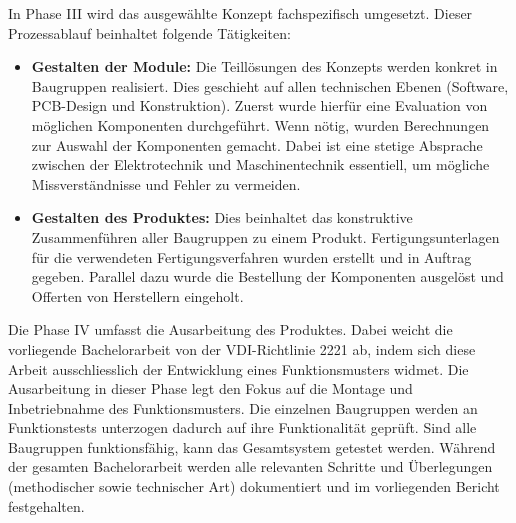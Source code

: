 In Phase III wird das ausgewählte Konzept fachspezifisch umgesetzt.  Dieser Prozessablauf beinhaltet folgende Tätigkeiten: 
\begin{itemize}
	\item \textbf{Gestalten der Module:} Die Teillösungen des Konzepts werden konkret in Baugruppen realisiert. Dies geschieht auf allen technischen Ebenen (Software, PCB-Design und Konstruktion). Zuerst wurde hierfür eine Evaluation von möglichen Komponenten durchgeführt. Wenn nötig, wurden Berechnungen zur Auswahl der Komponenten gemacht. Dabei ist eine stetige Absprache zwischen der Elektrotechnik und Maschinentechnik essentiell, um mögliche Missverständnisse und Fehler zu vermeiden.
	
	\item \textbf{Gestalten des Produktes:} Dies beinhaltet das konstruktive Zusammenführen aller Baugruppen zu einem Produkt. Fertigungsunterlagen für die verwendeten Fertigungsverfahren wurden erstellt und in Auftrag gegeben. Parallel dazu wurde die Bestellung der Komponenten ausgelöst und Offerten von Herstellern eingeholt. 
\end{itemize}

Die Phase IV umfasst die Ausarbeitung des Produktes. Dabei weicht die vorliegende Bachelorarbeit von der VDI-Richtlinie 2221 ab, indem sich diese Arbeit ausschliesslich der Entwicklung eines Funktionsmusters widmet.
\newline
Die Ausarbeitung in dieser Phase legt den Fokus auf die Montage und Inbetriebnahme des Funktionsmusters. Die einzelnen Baugruppen werden an Funktionstests unterzogen dadurch auf ihre Funktionalität geprüft. Sind alle Baugruppen funktionsfähig, kann das Gesamtsystem getestet werden.
\newline
Während der gesamten Bachelorarbeit werden alle relevanten Schritte und Überlegungen (methodischer sowie technischer Art) dokumentiert und im vorliegenden Bericht festgehalten.